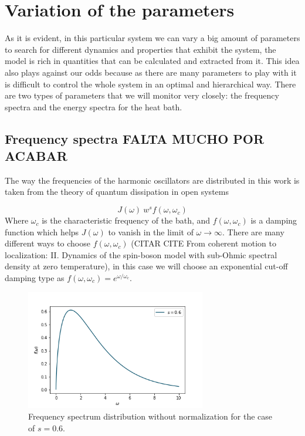 \section{Variation of the parameters}
As it is evident, in this particular system we can vary a big amount of parameters to search for different dynamics and properties that exhibit the system, the model is rich in quantities that can be calculated and extracted from it. This idea also plays against our odds because as there are many parameters to play with it is difficult to control the whole system in an optimal and hierarchical way. There are two types of parameters that we will monitor very closely: the frequency spectra and the energy spectra for the heat bath.


\subsection{Frequency spectra FALTA MUCHO POR ACABAR}
The way the frequencies of the harmonic oscillators are distributed in this work is taken from the theory of quantum dissipation in open systems

\begin{equation}
J(\omega) ~ w^s f(\omega,\omega_c)
\label{eq:spectral_density}
\end{equation}
Where $\omega_c$ is the characteristic frequency of the bath, and $f(\omega,\omega_c)$ is a damping function which helps $J(\omega)$ to vanish in the limit of $\omega \rightarrow \infty$. There are many different ways to choose $f(\omega,\omega_c)$ (CITAR CITE From coherent motion to localization: II. Dynamics of the spin-boson model
with sub-Ohmic spectral density at zero temperature), in this case we will choose an exponential cut-off damping type as $f(\omega,\omega_c)=e^{\omega/\omega_c}$.   

\begin{figure}[H]
\centering
\includegraphics[width=0.7\textwidth]{Figures/frequency_spectra.png}
\caption{Frequency spectrum distribution without normalization for the case of $s=0.6$.\label{fig:frequency_spectra}
}
\end{figure} 


